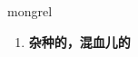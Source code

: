 
\begin{frame}
{\huge mongrel}
\begin{center}
\begin{enumerate}\Large
  \item \textbf{杂种的，混血儿的}
\end{enumerate}
\end{center}
\end{frame}
